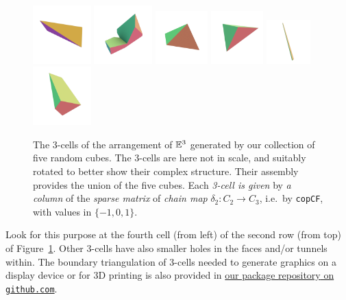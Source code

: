 \documentclass[11pt, oneside]{amsart}   	%
\begin{document}
\begin{figure}[htbp]
   \includegraphics[width=0.20\textwidth]{images/0022.png}%
\vspace{-10mm}      
   \includegraphics[width=0.20\textwidth]{images/0023.png}\hspace{3mm}%
   \includegraphics[width=0.18\textwidth]{images/0024.png}%
   \includegraphics[width=0.18\textwidth]{images/0025.png}%
   \includegraphics[width=0.15\textwidth]{images/0026.png}\hspace{-7mm}%
   \includegraphics[width=0.20\textwidth]{images/0027.png}%
\caption{The 3-cells of the arrangement of $\mathbb{E}^3$ generated by our collection of five random cubes.
   The 3-cells are here not in scale, and suitably rotated to better show their complex structure.
   Their assembly provides the union of the five cubes.
   Each \emph{3-cell is given} by \emph{a column} of the \emph{sparse matrix} of \emph{chain map} $\delta_2: C_2\to C_3$, i.e.~by \texttt{copCF}, with values in $\{-1,0,1\}$.
   }
   \label{fig:3-cells}
\end{figure}
Look for this purpose at the fourth cell (from left) of the second row (from top) of Figure~\ref{fig:3-cells}. Other 3-cells have also smaller holes in the faces and/or tunnels within. The boundary triangulation of 3-cells  needed to generate graphics on a display device or for 3D printing is also provided in \href{https://github.com/cvdlab/LinearAlgebraicRepresentation.jl}{our package {repository} on \texttt{github.com}}.
\end{document}
